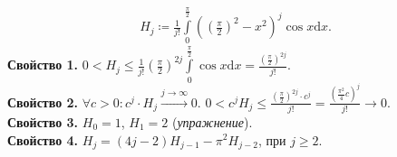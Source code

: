 \begin{example}
    \begin{align}
    H_j \coloneqq \frac{1}{j!} \int\limits_0^{\frac{\pi}{2}}\left(\left(\frac{\pi}{2}\right)^2 - x^2\right)^j \cos x \mathrm{d}x.
    \end{align}
    \textbf{Свойство 1.} $0 < H_j \le \frac{1}{j!}\left(\frac{\pi}{2}\right)^{2j} \int\limits_0^{\frac{\pi}{2}} \cos x \mathrm{d}x = \frac{\left(\frac{\pi}{2}\right)^{2j}}{j!}$.\\
    \textbf{Свойство 2.} $\forall c > 0\!: c^j \cdot H_j \xrightarrow{j \to \infty} 0$.  $0 < c^j H_j \le \frac{\left(\frac{\pi}{2}\right)^{2j} \cdot c^j}{j!} = \frac{\left(\frac{\pi^2}{4}c\right)^j}{j!} \to 0$.\\
    \textbf{Свойство 3.} $H_0 = 1$,  $H_1 = 2$ (\textit{упражнение}).\\
    \textbf{Свойство 4.} $H_j = (4j - 2) H_{j-1} - \pi^2 H_{j-2}$, при  $j \ge 2$.
\end{example}

